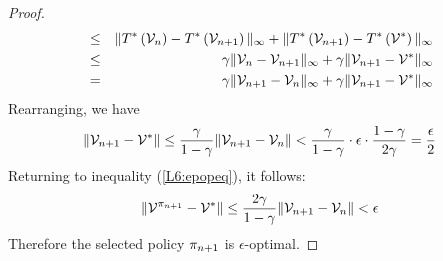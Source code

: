 \begin{proof}
\begin{eqnarray*}
 & \leq & \|T^{*}\left(\mathcal{V}_{n}\right)-T^{*}\left(\mathcal{V}_{n+1}\right)\|_{\infty}+\|T^{*}\left(\mathcal{V}_{n+1}\right)-T^{*}\left(\mathcal{V}^{*}\right)\|_{\infty}\\
 & \leq & \gamma\|\mathcal{V}_{n}-\mathcal{V}_{n+1}\|_{\infty}+\gamma\|\mathcal{V}_{n+1}-\mathcal{V}^{*}\|_{\infty}\\
 & = & \gamma\|\mathcal{V}_{n+1}-\mathcal{V}_{n}\|_{\infty}+\gamma\|\mathcal{V}_{n+1}-\mathcal{V}^{*}\|_{\infty}
\end{eqnarray*}
 Rearranging, we have
\begin{eqnarray*}
\|\mathcal{V}_{n+1} - \mathcal{V}^{*}\| \leq
\frac{\gamma}{1-\gamma}\|\mathcal{V}_{n+1} - \mathcal{V}_{n}\|<
\frac{\gamma}{1-\gamma} \cdot \epsilon \cdot
\frac{1-\gamma}{2\gamma} =\frac{\epsilon}{2}
\end{eqnarray*}
Returning to inequality (\ref{L6:epopeq}), it follows:
\begin{eqnarray*}
\|\mathcal{V}^{\pi_{n+1}} - \mathcal{V}^{*}\| \leq
\frac{2\gamma}{1-\gamma}\|\mathcal{V}_{n+1} - \mathcal{V}_{n}\| <
\epsilon
\end{eqnarray*}
Therefore the selected policy $\pi_{n+1}$ is $\epsilon$-optimal.
\end{proof}



